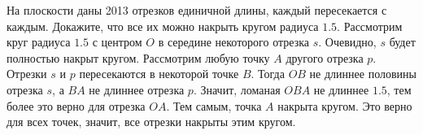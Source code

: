 \problem
На плоскости даны 2013 отрезков единичной длины, каждый пересекается с каждым.
Докажите, что все их можно накрыть кругом радиуса $1.5$.
\solution
Рассмотрим круг радиуса $1.5$ с центром $O$ в середине некоторого отрезка $s$.
Очевидно, $s$ будет полностью накрыт кругом.
Рассмотрим любую точку $A$ другого отрезка $p$.
Отрезки $s$ и $p$ пересекаются в некоторой точке $B$.
Тогда $OB$ не длиннее половины отрезка $s$, а $BA$ не длиннее отрезка $p$.
Значит, ломаная $OBA$ не длиннее $1.5$, тем более это верно для отрезка $OA$.
Тем самым, точка $A$ накрыта кругом.
Это верно для всех точек, значит, все отрезки накрыты этим кругом.
\endproblem

